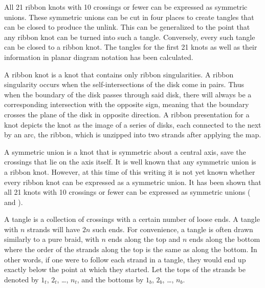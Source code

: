 
\diagrams
\theorems

\begin{paperabs}
All 21 ribbon knots with 10 crossings or fewer can be expressed as symmetric
unions.
These symmetric unions can be cut in four places to create tangles that can be
closed to produce the unlink.
This can be generalized to the point that any ribbon knot can be turned into
such a tangle.
Conversely, every such tangle can be closed to a ribbon knot.
The tangles for the first 21 knots as well as their information in planar
diagram notation has been calculated.
\end{paperabs}
\begin{paper}

A ribbon knot is a knot that contains only ribbon singularities.
A ribbon singularity occurs when the self-intersections of the disk come in
pairs.
Thus when the boundary of the disk passes through said disk, there will always
be a corresponding intersection with the opposite sign, meaning that the
boundary crosses the plane of the disk in opposite direction.
A ribbon presentation for a knot depicts the knot as the image of a series
of disks, each connected to the next by an arc, the ribbon, which is unzipped
into two strands after applying the map.

A symmetric union is a knot that is symmetric about a central axis, save the
crossings that lie on the axis itself.
It is well known that any symmetric union is a ribbon knot.
However, at this time of this writing it is not yet known whether every ribbon
knot can be expressed as a symmetric union.
It has been shown that all 21 knots with 10 crossings or fewer can be expressed
as symmetric unions (\cite{oneknot} and \cite{manyknots}).


A tangle is a collection of crossings with a certain number of loose ends.
A tangle with $n$ strands will have $2n$ such ends.
For convenience, a tangle is often drawn similarly to a pure braid, with $n$
ends along the top and $n$ ends along the bottom where the order of the strands
along the top is the same as along the bottom.
In other words, if one were to follow each strand in a tangle, they would end up
exactly below the point at which they started.
Let the tops of the strands be denoted by $1_t$, $2_t$, \dots, $n_t$, and the
bottoms  by $1_b$, $2_b$, \dots, $n_b$.


\end{paper}
